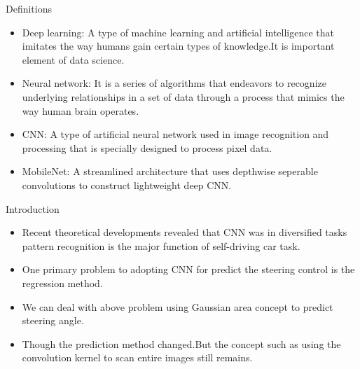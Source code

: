 \documentclass{beamer}
\begin{document}
\begin{frame}
\begin{block}{Definitions}
\begin{itemize}
\item Deep learning: A type of machine learning and artificial intelligence that imitates the way humans gain certain types of knowledge.It is important element of data science.

\item Neural network: It is a series of algorithms that endeavors to recognize underlying relationships in a set of data through a process that mimics the way human brain operates.

\item CNN: A type of artificial neural network used in image recognition and processing that is specially designed to process pixel data. 

\item MobileNet: A streamlined architecture that uses depthwise seperable convolutions to construct lightweight deep CNN.
\end{itemize}
\end{block}
\end{frame}

\begin{frame}
\begin{block}{Introduction}
\begin{itemize}
    \item Recent theoretical developments revealed that CNN was in diversified tasks pattern recognition is the major function of self-driving car task.
    \item One primary problem to adopting CNN for predict the steering control is the regression method.
    \item We can deal with above problem using Gaussian area concept to predict steering angle.
    \item Though the prediction method changed.But the concept such as using the convolution kernel to scan entire images still remains.
\end{itemize}
\end{block}
\end{frame}
\end{document}
